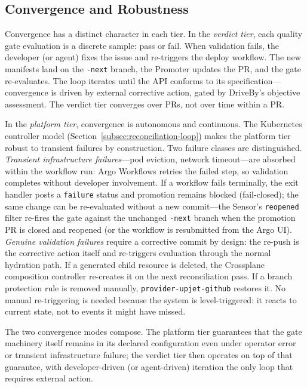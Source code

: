 \subsection{Convergence and Robustness}
\label{subsec:negative-feedback}

Convergence has a distinct character in each tier. In the \textit{verdict tier}, each quality gate evaluation is a discrete sample: pass or fail. When validation fails, the developer (or agent) fixes the issue and re-triggers the deploy workflow. The new manifests land on the \texttt{-next} branch, the Promoter updates the PR, and the gate re-evaluates. The loop iterates until the API conforms to its specification---convergence is driven by external corrective action, gated by DriveBy's objective assessment. The verdict tier converges over PRs, not over time within a PR.

In the \textit{platform tier}, convergence is autonomous and continuous. The Kubernetes controller model (Section~\ref{subsec:reconciliation-loop}) makes the platform tier robust to transient failures by construction. Two failure classes are distinguished. \textit{Transient infrastructure failures}---pod eviction, network timeout---are absorbed within the workflow run: Argo Workflows retries the failed step, so validation completes without developer involvement. If a workflow fails terminally, the exit handler posts a \texttt{failure} status and promotion remains blocked (fail-closed); the same change can be re-evaluated without a new commit---the Sensor's \texttt{reopened} filter re-fires the gate against the unchanged \texttt{-next} branch when the promotion PR is closed and reopened (or the workflow is resubmitted from the Argo UI). \textit{Genuine validation failures} require a corrective commit by design: the re-push is the corrective action itself and re-triggers evaluation through the normal hydration path. If a generated child resource is deleted, the Crossplane composition controller re-creates it on the next reconciliation pass. If a branch protection rule is removed manually, \texttt{provider-upjet-github} restores it. No manual re-triggering is needed because the system is level-triggered: it reacts to current state, not to events it might have missed.

The two convergence modes compose. The platform tier guarantees that the gate machinery itself remains in its declared configuration even under operator error or transient infrastructure failure; the verdict tier then operates on top of that guarantee, with developer-driven (or agent-driven) iteration the only loop that requires external action.

